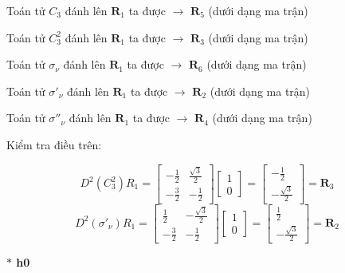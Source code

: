 \documentclass{article}
\begin{document}
Toán tử $C_3$ đánh lên $\textbf{R}_1$ ta được $\rightarrow$ $\textbf{R}_5$ (dưới dạng ma trận)

Toán tử $C_3^2$ đánh lên $\textbf{R}_1$ ta được $\rightarrow$ $\textbf{R}_3$ (dưới dạng ma trận)

Toán tử $\sigma_\nu$ đánh lên $\textbf{R}_1$ ta được $\rightarrow$ $\textbf{R}_6$ (dưới dạng ma trận)

Toán tử $\sigma'_\nu$ đánh lên $\textbf{R}_1$ ta được $\rightarrow$ $\textbf{R}_2$ (dưới dạng ma trận)

Toán tử $\sigma''_\nu$ đánh lên $\textbf{R}_1$ ta được $\rightarrow$ $\textbf{R}_4$ (dưới dạng ma trận)

Kiểm tra điều trên:

\[
    \renewcommand{\arraystretch}{0.75}
    D^2\left(C_3^2\right)R_1 =
    \begin{bmatrix}
        -\frac{1}{2} & \frac{\sqrt{3}}{2} \\
        -\frac{3}{2} & -\frac{1}{2}
    \end{bmatrix}
    \begin{bmatrix}
        1 \\
        0
    \end{bmatrix}
    =
    \begin{bmatrix}
        -\frac{1}{2} \\
        -\frac{\sqrt{3}}{2}
    \end{bmatrix}
    = \textbf{R}_3
\]
\[
    \renewcommand{\arraystretch}{0.75}
    D^2\left(\sigma'_\nu\right)R_1 =
    \begin{bmatrix}
        \frac{1}{2}  & -\frac{\sqrt{3}}{2} \\
        -\frac{3}{2} & -\frac{1}{2}
    \end{bmatrix}
    \begin{bmatrix}
        1 \\
        0
    \end{bmatrix}
    =
    \begin{bmatrix}
        \frac{1}{2} \\
        -\frac{\sqrt{3}}{2}
    \end{bmatrix}
    = \textbf{R}_2
\]


\textbf{ $\ast$ h0}
\end{document}
